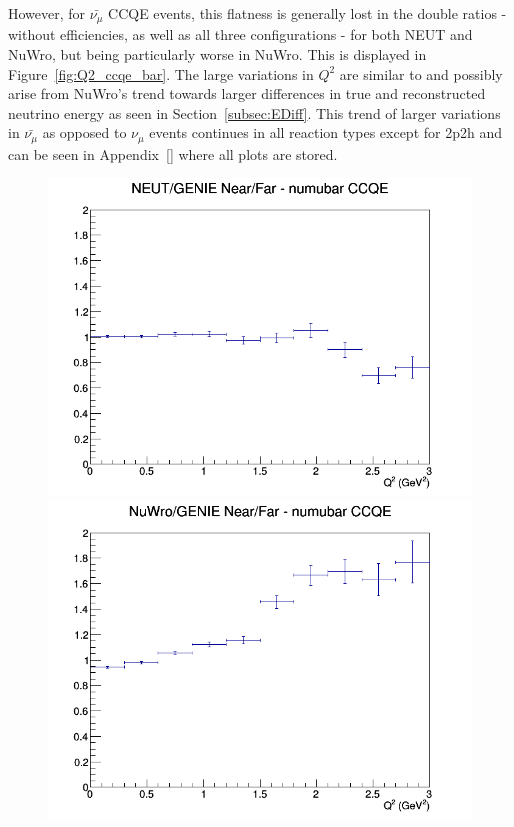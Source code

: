 \documentclass[12pt]{article}
\begin{document}
However, for $\bar{\nu_{\mu}}$ CCQE events, this flatness is generally lost in the double ratios - without efficiencies, as well as all three configurations - for both NEUT and NuWro, but being particularly worse in NuWro. This is displayed in Figure~\ref{fig:Q2_ccqe_bar}. The large variations in $Q^2$ are similar to and possibly arise from NuWro's trend towards larger differences in true and reconstructed neutrino energy as seen in Section~\ref{subsec:EDiff}. This trend of larger variations in $\bar{\nu_{\mu}}$ as opposed to $\nu_{\mu}$ events continues in all reaction types except for 2p2h and can be seen in Appendix~\ref{} where all plots are stored.
\begin{figure}[h]
\includegraphics[width=\linewidth]{Q2/nominal/ratios/CCQE_NEUT_GENIE_numubar_NF_Q2.png}
\endminipage
{}
\includegraphics[width=\linewidth]{Q2/nominal/ratios/CCQE_NuWro_GENIE_numubar_NF_Q2.png}

\end{figure}
\end{document}
